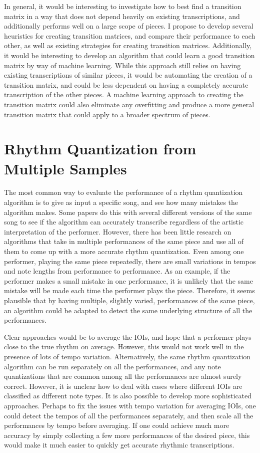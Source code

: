 \documentclass[11pt]{article}
\begin{document}
In general, it would be interesting to investigate how to best find a transition matrix in a way that does not depend heavily on existing transcriptions, and additionally performs well on a large scope of pieces. I propose to develop several heuristics for creating transition matrices, and compare their performance to each other, as well as existing strategies for creating transition matrices. Additionally, it would be interesting to develop an algorithm that could learn a good transition matrix by way of machine learning. While this approach still relies on having existing transcriptions of similar pieces, it would be automating the creation of a transition matrix, and could be less dependent on having a completely accurate transcription of the other pieces. A machine learning approach to creating the transition matrix could also eliminate any overfitting and produce a more general transition matrix that could apply to a broader spectrum of pieces.

\section{Rhythm Quantization from Multiple Samples}
The most common way to evaluate the performance of a rhythm quantization algorithm is to give as input a specific song, and see how many mistakes the algorithm makes. Some papers do this with several different versions of the same song to see if the algorithm can accurately transcribe regardless of the artistic interpretation of the performer. However, there has been little research on algorithms that take in multiple performances of the same piece and use all of them to come up with a more accurate rhythm quantization. Even among one performer, playing the same piece repeatedly, there are small variations in tempos and note lengths from performance to performance. As an example, if the performer makes a small mistake in one performance, it is unlikely that the same mistake will be made each time the performer plays the piece. Therefore, it seems plausible that by having multiple, slightly varied, performances of the same piece, an algorithm could be adapted to detect the same underlying structure of all the performances.

Clear approaches would be to average the IOIs, and hope that a performer plays close to the true rhythm on average. However, this would not work well in the presence of lots of tempo variation. Alternatively, the same rhythm quantization algorithm can be run separately on all the performances, and any note quantizations that are common among all the performances are almost surely correct. However, it is unclear how to deal with cases where different IOIs are classified as different note types. It is also possible to develop more sophisticated approaches. Perhaps to fix the issues with tempo variation for averaging IOIs, one could detect the tempos of all the performances separately, and then scale all the performances by tempo before averaging. If one could achieve much more accuracy by simply collecting a few more performances of the desired piece, this would make it much easier to quickly get accurate rhythmic transcriptions.
\end{document}
